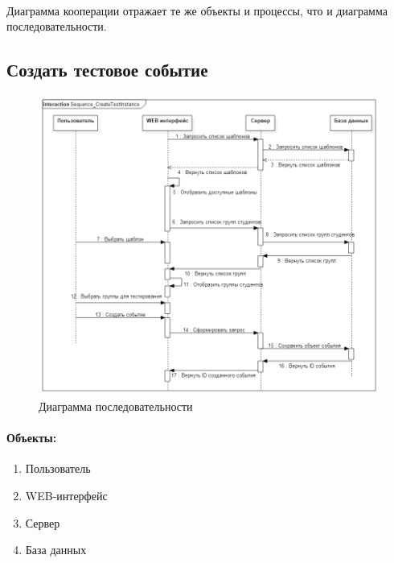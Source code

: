 \documentclass{article}
\begin{document}
        \paragraph{}
        Диаграмма кооперации отражает те же объекты и процессы, что и диаграмма
        последовательности.
    
    
    \subsection{Создать тестовое событие}
        \begin{figure}[H]
            \includegraphics[width=\textwidth, center]
                {Sequence_CreateTestInstance}
            \caption{Диаграмма последовательности}
        \end{figure}
        \paragraph{Объекты:}
        \begin{enumerate}
            \item Пользователь
            \item WEB-интерфейс
            \item Сервер
            \item База данных 
        \end{enumerate}
\end{document}
